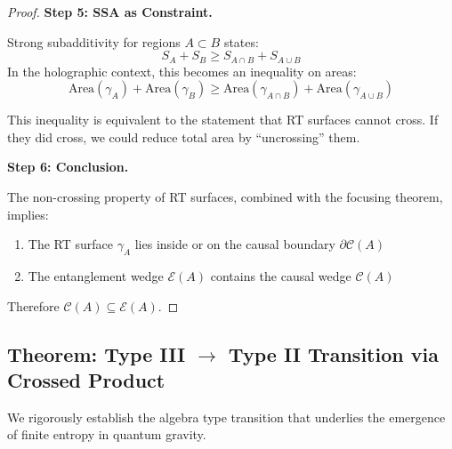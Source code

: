 \documentclass[12pt,a4paper]{article}
\begin{document}
\begin{proof}
\textbf{Step 5: SSA as Constraint.}

Strong subadditivity for regions $A \subset B$ states:
\begin{equation}
S_A + S_B \geq S_{A \cap B} + S_{A \cup B}
\end{equation}
In the holographic context, this becomes an inequality on areas:
\begin{equation}
\text{Area}(\gamma_A) + \text{Area}(\gamma_B) \geq \text{Area}(\gamma_{A \cap B}) + \text{Area}(\gamma_{A \cup B})
\end{equation}

This inequality is equivalent to the statement that RT surfaces cannot cross. If they did cross, we could reduce total area by ``uncrossing'' them.

\textbf{Step 6: Conclusion.}

The non-crossing property of RT surfaces, combined with the focusing theorem, implies:
\begin{enumerate}
    \item The RT surface $\gamma_A$ lies inside or on the causal boundary $\partial\mathcal{C}(A)$
    \item The entanglement wedge $\mathcal{E}(A)$ contains the causal wedge $\mathcal{C}(A)$
\end{enumerate}

Therefore $\mathcal{C}(A) \subseteq \mathcal{E}(A)$.
\end{proof}

\subsection{Theorem: Type III $\to$ Type II Transition via Crossed Product}

We rigorously establish the algebra type transition that underlies the emergence of finite entropy in quantum gravity.
\end{document}
